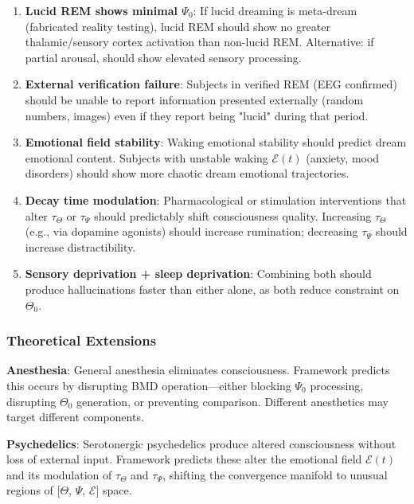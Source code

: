 \documentclass[11pt,a4paper]{article}
\begin{document}
\begin{enumerate}
\item \textbf{Lucid REM shows minimal $\Psi_0$}: If lucid dreaming is meta-dream (fabricated reality testing), lucid REM should show no greater thalamic/sensory cortex activation than non-lucid REM. Alternative: if partial arousal, should show elevated sensory processing.

\item \textbf{External verification failure}: Subjects in verified REM (EEG confirmed) should be unable to report information presented externally (random numbers, images) even if they report being "lucid" during that period.

\item \textbf{Emotional field stability}: Waking emotional stability should predict dream emotional content. Subjects with unstable waking $\mathcal{E}(t)$ (anxiety, mood disorders) should show more chaotic dream emotional trajectories.

\item \textbf{Decay time modulation}: Pharmacological or stimulation interventions that alter $\tau_{\Theta}$ or $\tau_{\Psi}$ should predictably shift consciousness quality. Increasing $\tau_{\Theta}$ (e.g., via dopamine agonists) should increase rumination; decreasing $\tau_{\Psi}$ should increase distractibility.

\item \textbf{Sensory deprivation + sleep deprivation}: Combining both should produce hallucinations faster than either alone, as both reduce constraint on $\Theta_0$.
\end{enumerate}

\subsubsection{Theoretical Extensions}

\textbf{Anesthesia}: General anesthesia eliminates consciousness. Framework predicts this occurs by disrupting BMD operation—either blocking $\Psi_0$ processing, disrupting $\Theta_0$ generation, or preventing comparison. Different anesthetics may target different components.

\textbf{Psychedelics}: Serotonergic psychedelics produce altered consciousness without loss of external input. Framework predicts these alter the emotional field $\mathcal{E}(t)$ and its modulation of $\tau_{\Theta}$ and $\tau_{\Psi}$, shifting the convergence manifold to unusual regions of [$\Theta$, $\Psi$, $\mathcal{E}$] space.
\end{document}
